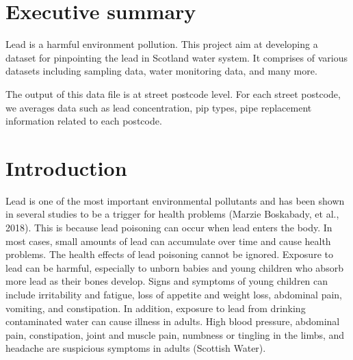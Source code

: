 \documentclass[11pt,twoside]{article}
\numberwithin{Theorem}{section}
\numberwithin{Definition}{section}
\numberwithin{Lemma}{section}
\numberwithin{Algorithm}{section}
\numberwithin{equation}{section}
\begin{document}
\cleardoublepage

\setcounter{page}{1}


\clearpage

\section*{Executive summary}
\label{sec.intro}
Lead is a harmful environment pollution.
This project aim at developing a dataset for pinpointing
the lead in Scotland water system.
It comprises of various datasets including sampling data,
water monitoring data, and many more.

The output of this data file is at street postcode level.
For each street postcode,
we averages data such as lead concentration, pip types,
pipe replacement information related to each postcode.

\clearpage

\section{Introduction}
\label{sec.intro}
Lead is one of the most important environmental pollutants and has been shown in several studies to be a trigger for health problems (Marzie Boskabady, et al., 2018). This is because lead poisoning can occur when lead enters the body. In most cases, small amounts of lead can accumulate over time and cause health problems. The health effects of lead poisoning cannot be ignored. Exposure to lead can be harmful, especially to unborn babies and young children who absorb more lead as their bones develop. Signs and symptoms of young children can include irritability and fatigue, loss of appetite and weight loss, abdominal pain, vomiting, and constipation. In addition, exposure to lead from drinking contaminated water can cause illness in adults. High blood pressure, abdominal pain, constipation, joint and muscle pain, numbness or tingling in the limbs, and headache are suspicious symptoms in adults (Scottish Water).
\end{document}
